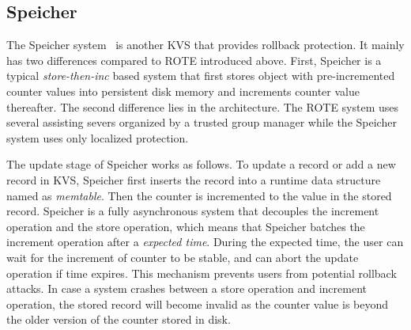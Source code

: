 \subsection{Speicher}

The Speicher system~\cite{} is another KVS that provides rollback protection.
It mainly has two differences compared to ROTE introduced above. First, 
Speicher is a typical \textit{store-then-inc} based system that first stores 
object with pre-incremented counter values into persistent disk memory and increments
counter value thereafter. The second difference lies in the architecture. The ROTE system
uses several assisting severs organized by a trusted group manager while the Speicher system 
uses only localized protection.

The update stage of Speicher works as follows. To update a record or add a new 
record in KVS, Speicher first inserts the record into a runtime data structure
named as \textit{memtable}. Then the counter is incremented to the value in 
the stored record. Speicher is a fully asynchronous system that decouples the 
increment operation and the store operation, which means that Speicher batches
the increment operation after a \textit{expected time}. During the expected 
time, the user can wait for the increment of counter to be stable, and can 
abort the update operation if time expires. This mechanism prevents users 
from potential rollback attacks. In case a system crashes between a store
operation and increment operation, the stored record will become invalid as 
the counter value is beyond the older version of the counter stored in disk.




